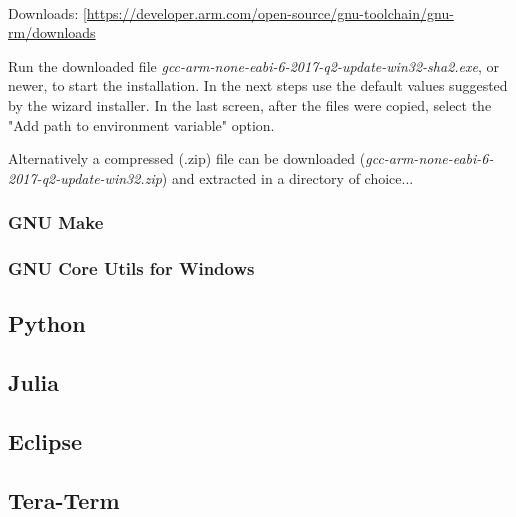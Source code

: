 \begin{flushleft}
\\

Downloads: [\href{https://developer.arm.com/open-source/gnu-toolchain/gnu-rm/downloads}{https://developer.arm.com/open-source/gnu-toolchain/gnu-rm/downloads}\\
\end{flushleft}

Run the downloaded file \textit{gcc-arm-none-eabi-6-2017-q2-update-win32-sha2.exe}, or newer, to start the installation.
In the next steps use the default values suggested by the wizard installer.
In the last screen, after the files were copied, select the "Add path to environment variable" option.

Alternatively a compressed (.zip) file can be downloaded (\textit{gcc-arm-none-eabi-6-2017-q2-update-win32.zip}) and extracted in a directory of choice...

\subsubsection{GNU Make}

\subsubsection{GNU Core Utils for Windows}

\subsection{Python}

\subsection{Julia}


\subsection{Eclipse}

\subsection{Tera-Term}


